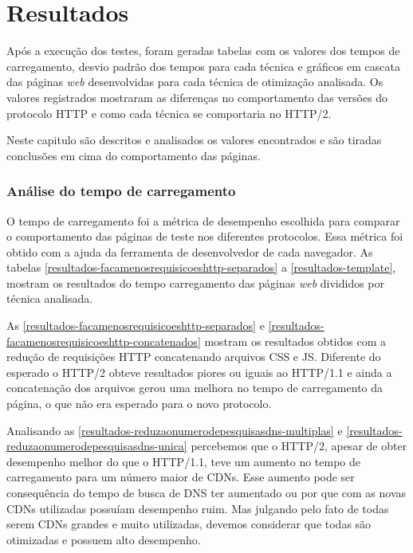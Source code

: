 %
%

\chapter{Resultados}

Após a execução dos testes, foram geradas tabelas com os valores dos tempos de carregamento, desvio padrão dos tempos para cada técnica e gráficos em cascata das páginas \textit{web} desenvolvidas para cada técnica de otimização analisada. Os valores registrados mostraram as diferenças no comportamento das versões do protocolo HTTP e como cada técnica se comportaria no HTTP/2.

Neste capitulo são descritos e analisados os valores encontrados e são tiradas conclusões em cima do comportamento das páginas.

\subsection{Análise do tempo de carregamento}
\label{analisedotempodecarregamento}

O tempo de carregamento foi a métrica de desempenho escolhida para comparar o comportamento das páginas de teste nos diferentes protocolos. Essa métrica foi obtido com a ajuda da ferramenta de desenvolvedor de cada navegador. As tabelas \autoref{resultados-facamenosrequisicoeshttp-separados} a \autoref{resultados-template}, mostram os resultados do tempo carregamento das páginas \textit{web} divididos por técnica analisada.





As \autoref{resultados-facamenosrequisicoeshttp-separados} e \autoref{resultados-facamenosrequisicoeshttp-concatenados} mostram os resultados obtidos com a redução de requisições HTTP concatenando arquivos CSS e JS. Diferente do esperado o HTTP/2 obteve resultados piores ou iguais ao HTTP/1.1 e ainda a concatenação dos arquivos gerou uma melhora no tempo de carregamento da página, o que não era esperado para o novo protocolo.





Analisando as \autoref{resultados-reduzaonumerodepesquisasdns-multiplas} e \autoref{resultados-reduzaonumerodepesquisasdns-unica} percebemos que o HTTP/2, apesar de obter desempenho melhor do que o HTTP/1.1, teve um aumento no tempo de carregamento para um número maior de CDNs. Esse aumento pode ser consequência do tempo de busca de DNS ter aumentado ou por que com as novas CDNs utilizadas possuíam desempenho ruim. Mas julgando pelo fato de todas serem CDNs grandes e muito utilizadas, devemos considerar que todas são otimizadas e possuem alto desempenho. 

